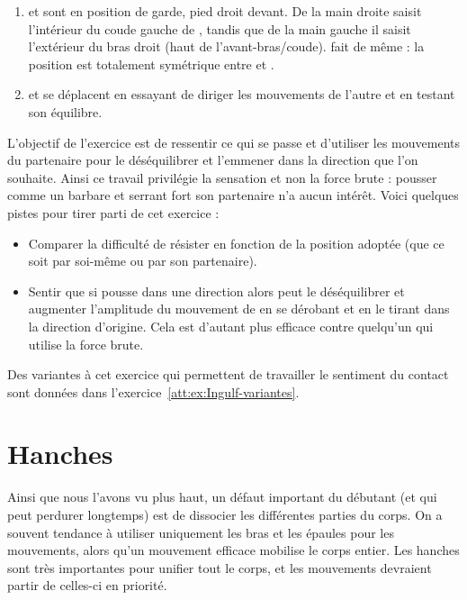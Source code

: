 \begin{exercice}
\label{struc:ex:Ingulf}


\begin{enumerate}
	\item \A et \D sont en position de garde, pied droit devant.
	De la main droite \A saisit l'intérieur du coude gauche de \D, tandis que de la main gauche il saisit l'extérieur du bras droit (haut de l'avant-bras/coude).
	\D fait de même : la position est totalement symétrique entre \A et \D.
	
	\item \A et \D se déplacent en essayant de diriger les mouvements de l'autre et en testant son équilibre.
\end{enumerate}

L'objectif de l'exercice est de ressentir ce qui se passe et d'utiliser les mouvements du partenaire pour le déséquilibrer et l'emmener dans la direction que l'on souhaite.
Ainsi ce travail privilégie la sensation et non la force brute : pousser comme un barbare et serrant fort son partenaire n'a aucun intérêt.
Voici quelques pistes pour tirer parti de cet exercice :
\begin{itemize}
	\item Comparer la difficulté de résister en fonction de la position adoptée (que ce soit par soi-même ou par son partenaire).
	
	\item Sentir que si \A pousse dans une direction alors \D peut le déséquilibrer et augmenter l'amplitude du mouvement de \A en se dérobant et en le tirant dans la direction d'origine.
	Cela est d'autant plus efficace contre quelqu'un qui utilise la force brute.
\end{itemize}

Des variantes à cet exercice qui permettent de travailler le sentiment du contact sont données dans l'exercice~\ref{att:ex:Ingulf-variantes}.


\end{exercice}


\section{Hanches}


Ainsi que nous l'avons vu plus haut, un défaut important du débutant (et qui peut perdurer longtemps) est de dissocier les différentes parties du corps.
On a souvent tendance à utiliser uniquement les bras et les épaules pour les mouvements, alors qu'un mouvement efficace mobilise le corps entier.
Les hanches sont très importantes pour unifier tout le corps, et les mouvements devraient partir de celles-ci en priorité.


